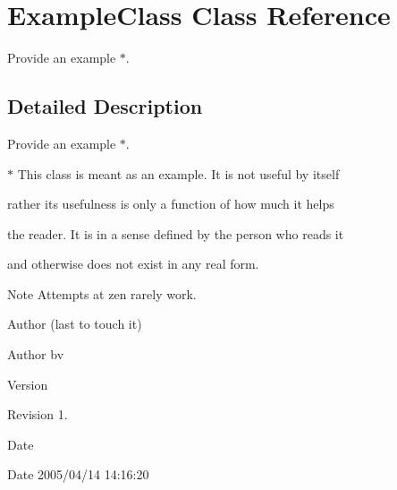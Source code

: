 \hypertarget{class_example_class}{}\section{Example\+Class Class Reference}
\label{class_example_class}


Provide an example $\ast$.  




\subsection{Detailed Description}
Provide an example $\ast$. 


\begin{DoxyItemize}
\item 
\item $\ast$ This class is meant as an example. It is not useful by itself
\item rather its usefulness is only a function of how much it helps
\item the reader. It is in a sense defined by the person who reads it
\item and otherwise does not exist in any real form.
\item 
\item \begin{DoxyNote}{Note}
Attempts at zen rarely work.
\end{DoxyNote}

\item 
\item \begin{DoxyAuthor}{Author}
(last to touch it) 
\end{DoxyAuthor}
\begin{DoxyParagraph}{Author}
bv 
\end{DoxyParagraph}

\item 
\item \begin{DoxyVersion}{Version}

\end{DoxyVersion}
\begin{DoxyParagraph}{Revision}
1. 
\end{DoxyParagraph}

\item 
\item \begin{DoxyDate}{Date}

\end{DoxyDate}
\begin{DoxyParagraph}{Date}
2005/04/14 14\+:16\+:20 
\end{DoxyParagraph}


\end{DoxyItemize}
